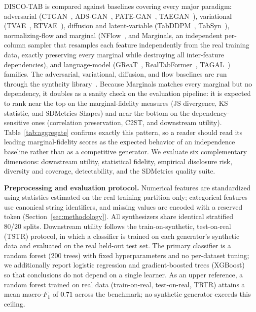 DISCO-TAB is compared against baselines covering every major paradigm: adversarial (CTGAN~\cite{xu2019modeling}, ADS-GAN~\cite{yoon2020anonymization}, PATE-GAN~\cite{jordon2019pategan}, TAEGAN~\cite{li2025taegangeneratingsynthetictabular}), variational (TVAE~\cite{xu2019modeling}, RTVAE~\cite{akrami2020robust}), diffusion and latent-variable (TabDDPM~\cite{kotelnikov2023tabddpm}, TabSyn~\cite{tabsyn}), normalizing-flow and marginal (NFlow~\cite{durkan2019neural}, and Marginals, an independent per-column sampler that resamples each feature independently from the real training data, exactly preserving every marginal while destroying all inter-feature dependencies), and language-model (GReaT~\cite{borisov2022language}, RealTabFormer~\cite{solatorio2023realtabformer}, TAGAL~\cite{ronval2025tagal}) families. The adversarial, variational, diffusion, and flow baselines are run through the synthcity library~\cite{qian2023synthcity}. Because Marginals matches every marginal but no dependency, it doubles as a sanity check on the evaluation pipeline: it is expected to rank near the top on the marginal-fidelity measures (JS divergence, KS statistic, and SDMetrics Shapes) and near the bottom on the dependency-sensitive ones (correlation preservation, C2ST, and downstream utility). Table~\ref{tab:aggregate} confirms exactly this pattern, so a reader should read its leading marginal-fidelity scores as the expected behavior of an independence baseline rather than as a competitive generator. We evaluate six complementary dimensions: downstream utility, statistical fidelity, empirical disclosure risk, diversity and coverage, detectability, and the SDMetrics quality suite.

\noindent\textbf{Preprocessing and evaluation protocol.} Numerical features are standardized using statistics estimated on the real training partition only; categorical features use canonical string identifiers, and missing values are encoded with a reserved token (Section~\ref{sec:methodology}). All synthesizers share identical stratified 80/20 splits. Downstream utility follows the train-on-synthetic, test-on-real (TSTR) protocol, in which a classifier is trained on each generator's synthetic data and evaluated on the real held-out test set. The primary classifier is a random forest (200 trees) with fixed hyperparameters and no per-dataset tuning; we additionally report logistic regression and gradient-boosted trees (XGBoost) so that conclusions do not depend on a single learner. As an upper reference, a random forest trained on real data (train-on-real, test-on-real, TRTR) attains a mean macro-$F_1$ of $0.71$ across the benchmark; no synthetic generator exceeds this ceiling.

